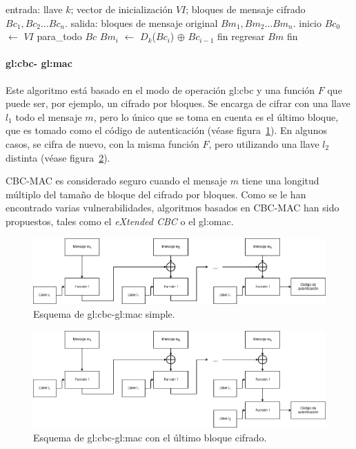 \begin{pseudocodigo}[%
    caption={\Gls{gl:modo_de_operacion} \acrshort{gl:cbc}, descifrado.},
    label={cbc:2}%
  ]
    entrada: llave $ k $; vector de inicialización $ VI $;
             bloques de mensaje cifrado $ Bc_1, Bc_2 \dots Bc_n $.
    salida:  bloques de mensaje original $ Bm_1, Bm_2 \dots Bm_n $.
    inicio
      $Bc_0$ $\gets$ $ VI $
      para_todo $Bc$
        $Bm_i$ $\gets$ $D_k$($Bc_i$) $\oplus$ $Bc_{i-1}$
      fin
      regresar $Bm$
    fin
\end{pseudocodigo}

\paragraph{\texorpdfstring{\acrshort{gl:cbc}}{CBC}-%
  \texorpdfstring{\acrshort{gl:mac}}{MAC}}
Este algoritmo está basado en el modo de operación \gls{gl:cbc} y una función
$F$ que puede ser, por ejemplo, un cifrado por bloques. Se encarga de
cifrar con una llave $l_1$ todo el mensaje $m$, pero lo único que se toma en
cuenta es el último bloque, que es tomado como el código de autenticación
(véase figura~\ref{mac:cbc1}). En algunos casos, se cifra de nuevo, con la
misma función $F$, pero utilizando una llave $l_2$ distinta (véase
figura~\ref{mac:cbc2}).

CBC-MAC es considerado seguro cuando el mensaje $m$ tiene una longitud
múltiplo del tamaño de bloque del cifrado por bloques. Como se le han
encontrado varias vulnerabilidades, algoritmos basados en CBC-MAC han sido
propuestos, tales como el \textit{eXtended CBC} o el \gls{gl:omac}.

\begin{figure}
  \begin{center}
    \includegraphics[width=0.9\linewidth]{diagramas/cbcmac.png}
    \caption{Esquema de \acrshort{gl:cbc}-\acrshort{gl:mac} simple.}
    \label{mac:cbc1}
  \end{center}
\end{figure}

\begin{figure}
  \begin{center}
    \includegraphics[width=0.9\linewidth]{diagramas/cbcmaclb.png}
    \caption{Esquema de \acrshort{gl:cbc}-\acrshort{gl:mac} 
      con el último bloque cifrado.}
    \label{mac:cbc2}
  \end{center}
\end{figure}

